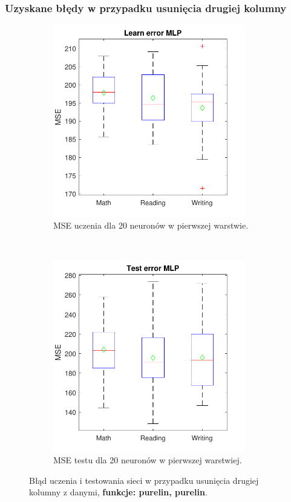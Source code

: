 \documentclass[12pt]{article}
\begin{document}
\subsubsection{Uzyskane błędy w przypadku usunięcia drugiej  kolumny}
\begin{figure}[H]
\centering
\begin{subfigure}[t]{0.48\textwidth} 
\centering
\includegraphics[height=3.3in]{purelin_purelin_20_without_2_learnBoxplot.pdf}
\caption{MSE uczenia dla  20 neuronów w pierwszej warstwie.}
\end{subfigure}
~~
\begin{subfigure}[t]{0.48\textwidth} 
\centering
\includegraphics[height=3.3in]{purelin_purelin_20_without_2_testBoxplot.pdf}
\caption{MSE testu dla  20  neuronów w pierwszej warstwiej.}
\end{subfigure}

\caption{Błąd uczenia i testowania sieci w przypadku usunięcia drugiej kolumny z danymi, \textbf{funkcje: purelin, purelin}.}
\end{figure}
\end{document}
